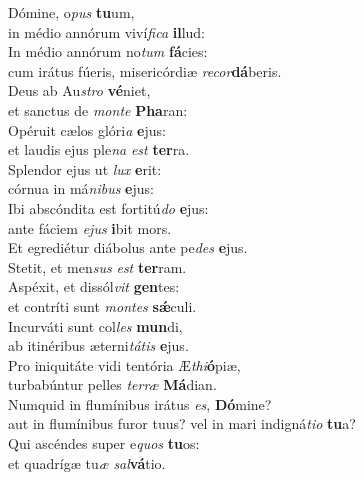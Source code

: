 \evenverse Dómine, o\textit{pus} \textbf{tu}um,~\*\\
\evenverse in médio annórum viví\textit{fi}\textit{ca} \textbf{il}lud:\\
\oddverse In médio annórum no\textit{tum} \textbf{fá}cies:~\*\\
\oddverse cum irátus fúeris, misericórdiæ \textit{re}\textit{cor}\textbf{dá}beris.\\
\evenverse Deus ab Au\textit{stro} \textbf{vé}niet,~\*\\
\evenverse et sanctus de \textit{mon}\textit{te} \textbf{Pha}ran:\\
\oddverse Opéruit cælos glóri\textit{a} \textbf{e}jus:~\*\\
\oddverse et laudis ejus ple\textit{na} \textit{est} \textbf{ter}ra.\\
\evenverse Splendor ejus ut \textit{lux} \textbf{e}rit:~\*\\
\evenverse córnua in má\textit{ni}\textit{bus} \textbf{e}jus:\\
\oddverse Ibi abscóndita est fortitú\textit{do} \textbf{e}jus:~\*\\
\oddverse ante fáciem \textit{e}\textit{jus} \textbf{i}bit mors.\\
\evenverse Et egrediétur diábolus ante pe\textit{des} \textbf{e}jus.~\*\\
\evenverse Stetit, et men\textit{sus} \textit{est} \textbf{ter}ram.\\
\oddverse Aspéxit, et dissól\textit{vit} \textbf{gen}tes:~\*\\
\oddverse et contríti sunt \textit{mon}\textit{tes} \textbf{sǽ}culi.\\
\evenverse Incurváti sunt col\textit{les} \textbf{mun}di,~\*\\
\evenverse ab itinéribus æterni\textit{tá}\textit{tis} \textbf{e}jus.\\
\oddverse Pro iniquitáte vidi tentória Æ\textit{thi}\textbf{ó}piæ,~\*\\
\oddverse turbabúntur pelles \textit{ter}\textit{ræ} \textbf{Má}dian.\\
\evenverse Numquid in flumínibus irátus \textit{es}, \textbf{Dó}mine?~\*\\
\evenverse aut in flumínibus furor tuus? vel in mari indigná\textit{ti}\textit{o} \textbf{tu}a?\\
\oddverse Qui ascéndes super e\textit{quos} \textbf{tu}os:~\*\\
\oddverse et quadrígæ tu\textit{æ} \textit{sal}\textbf{vá}tio.\\
